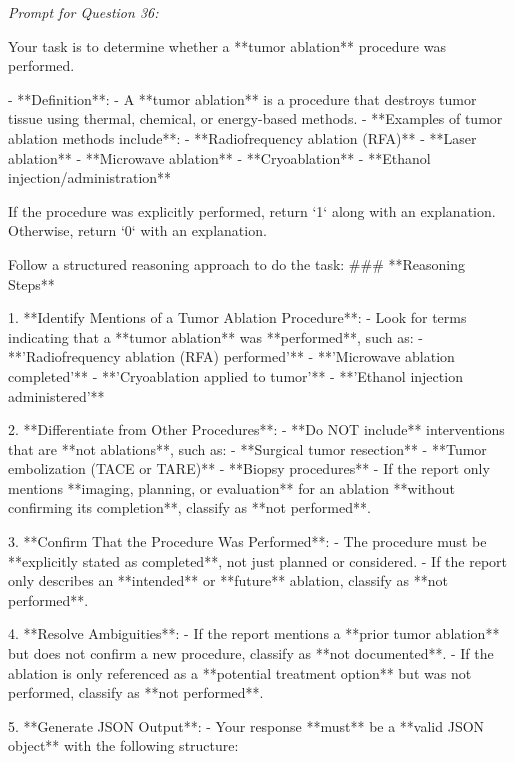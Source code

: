 \textit{\normalsize Prompt for Question  36:}
\begin{mdframed}[]
\normalsize

Your task is to determine whether a **tumor ablation** procedure was performed.  

- **Definition**:  
  - A **tumor ablation** is a procedure that destroys tumor tissue using thermal, chemical, or energy-based methods.  
  - **Examples of tumor ablation methods include**:  
    - **Radiofrequency ablation (RFA)**  
    - **Laser ablation**  
    - **Microwave ablation**  
    - **Cryoablation**  
    - **Ethanol injection/administration**  

If the procedure was explicitly performed, return `1` along with an explanation. Otherwise, return `0` with an explanation.

Follow a structured reasoning approach to do the task:
### **Reasoning Steps**  

1. **Identify Mentions of a Tumor Ablation Procedure**:  
   - Look for terms indicating that a **tumor ablation** was **performed**, such as:  
     - **'Radiofrequency ablation (RFA) performed'**  
     - **'Microwave ablation completed'**  
     - **'Cryoablation applied to tumor'**  
     - **'Ethanol injection administered'**  

2. **Differentiate from Other Procedures**:  
   - **Do NOT include** interventions that are **not ablations**, such as:  
     - **Surgical tumor resection**  
     - **Tumor embolization (TACE or TARE)**  
     - **Biopsy procedures**  
   - If the report only mentions **imaging, planning, or evaluation** for an ablation **without confirming its completion**, classify as **not performed**.  

3. **Confirm That the Procedure Was Performed**:  
   - The procedure must be **explicitly stated as completed**, not just planned or considered.  
   - If the report only describes an **intended** or **future** ablation, classify as **not performed**.  

4. **Resolve Ambiguities**:  
   - If the report mentions a **prior tumor ablation** but does not confirm a new procedure, classify as **not documented**.  
   - If the ablation is only referenced as a **potential treatment option** but was not performed, classify as **not performed**.  

5. **Generate JSON Output**:  
   - Your response **must** be a **valid JSON object** with the following structure:  

\end{mdframed}

